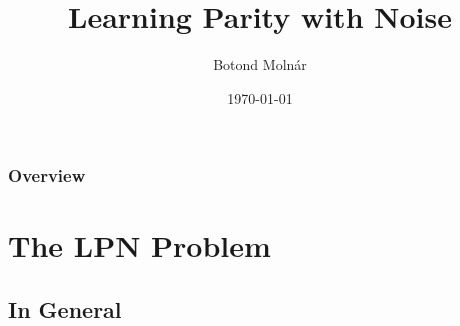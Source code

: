 \documentclass{beamer}
\title[LPN]{Learning Parity with Noise} %
\author{Botond Molnár} %
\institute[University of Debrecen] %
{
University of Debrecen \\ %
\medskip
\textit{molnarbotond.eagle@gmail.com} %
}
\date{\today} %
\begin{document}
\begin{frame}
  \titlepage %
\end{frame}

\begin{frame}
  \frametitle{Overview} %
  \tableofcontents %
\end{frame}

\section{The LPN Problem} %

\subsection{In General} %
\end{document}
